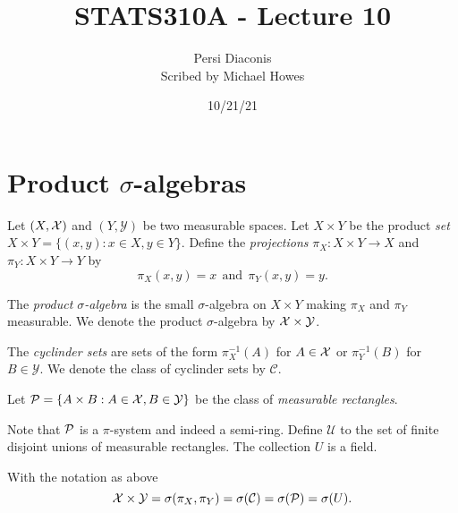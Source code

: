 

\newcommand{\Y}{\mathcal{Y}}
\newcommand{\Cyl}{\mathcal{C}}
\newcommand{\U}{\mathcal{U}}


\title{STATS310A - Lecture 10}
\author{Persi Diaconis\\ Scribed by Michael Howes}
\date{10/21/21}

\pagestyle{fancy}
\fancyhf{}


\maketitle
\tableofcontents
\section{Product $\sigma$-algebras}
Let $(X,{\mathcal{X}})$ and $(Y,\Y)$ be two measurable spaces. Let $X \times Y$ be the product \emph{set} $X \times Y = \{(x,y): x \in X, y \in Y\}$. Define the \emph{projections} $\pi_X : X\times Y \to X$ and $\pi_Y : X \times Y \to Y$ by
\[\pi_X(x,y) = x ~~\text{and}~~ \pi_Y(x,y) = y. \]
\begin{defn}
    The \emph{product $\sigma$-algebra} is the small $\sigma$-algebra on $X \times Y$ making $\pi_X$ and $\pi_Y$ measurable. We denote the product $\sigma$-algebra by $\X \times \Y$.
\end{defn}
\begin{defn}
    The \emph{cyclinder sets} are sets of the form $\pi_X^{-1}(A)$ for $A \in {\mathcal{X}}$ or $\pi_Y^{-1}(B)$ for $B \in \Y$. We denote the class of cyclinder sets by $\Cyl$.
\end{defn}
\begin{defn}
    Let $\Po = \{A \times B : A \in \X, B \in \Y\}$ be the class of \emph{measurable rectangles}.
\end{defn}
Note that ${\mathcal{P}}$ is a $\pi$-system and indeed a semi-ring. Define $\U$ to the set of finite disjoint unions of measurable rectangles. The collection $U$ is a field.

\begin{prop}
    With the notation as above
    \[\X \times \Y = \sigma(\pi_X,\pi_Y) = \sigma(\Cyl) = \sigma(\Po) = \sigma(U).  \]
\end{prop}

